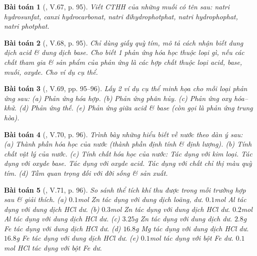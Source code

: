 \documentclass{article}
\newtheorem{baitoan}{Bài toán}
\begin{document}
\begin{baitoan}[\cite{Truong_BTNC_Hoa_Hoc_8_2022}, V.67, p. 95]
	Viết CTHH của những muối có tên sau: natri hydrosunfat, canxi hydrocarbonat, natri đihydrophotphat, natri hydrophophat, natri photphat.
\end{baitoan}

\begin{baitoan}[\cite{Truong_BTNC_Hoa_Hoc_8_2022}, V.68, p. 95]
	Chỉ dùng giấy quỳ tím, mô tả cách nhận biết dung dịch acid \& dung dịch base. Cho biết 1 phản ứng hóa học thuộc loại gì, nếu các chất tham gia \& sản phẩm của phản ứng là các hợp chất thuộc loại acid, base, muối, oxyde. Cho ví dụ cụ thể.
\end{baitoan}

\begin{baitoan}[\cite{Truong_BTNC_Hoa_Hoc_8_2022}, V.69, pp. 95--96]
	Lấy 2 ví dụ cụ thể minh họa cho mỗi loại phản ứng sau: (a) Phản ứng hóa hợp. (b) Phản ứng phân hủy. (c) Phản ứng oxy hóa--khử. (d) Phản ứng thế. (e) Phản ứng giữa acid \& base (còn gọi là \emph{phản ứng trung hòa}).
\end{baitoan}

\begin{baitoan}[\cite{Truong_BTNC_Hoa_Hoc_8_2022}, V.70, p. 96]
	Trình bày những hiểu biết về nước theo dàn ý sau: (a) Thành phần hóa học của nước (thành phần định tính \& định lượng). (b) Tính chất vật lý của nước. (c) Tính chất hóa học của nước: Tác dụng với kim loại. Tác dụng với oxyde base. Tác dụng với oxyde acid. Tác dụng với chất chỉ thị màu quỳ tím. (d) Tầm quan trọng đối với đời sống \& sản xuất.
\end{baitoan}

\begin{baitoan}[\cite{Truong_BTNC_Hoa_Hoc_8_2022}, V.71, p. 96]
	So sánh thể tích khí \emph{} thu được trong mỗi trường hợp sau \& giải thích. (a) $0.1$\emph{mol Zn} tác dụng với dung dịch \emph{} loãng, dư. $0.1$\emph{mol Al} tác dụng với dung dịch \emph{HCl} dư. (b) $0.3$\emph{mol Zn} tác dụng với dung dịch \emph{HCl} dư. $0.2$\emph{mol Al} tác dụng với dung dịch \emph{HCl} dư. (c) $3.25$\emph{g Zn} tác dụng với dung dịch \emph{} dư. $2.8$\emph{g Fe} tác dụng với dung dịch \emph{HCl} dư. (d) $16.8$\emph{g Mg} tác dụng với dung dịch \emph{HCl} dư. $16.8$\emph{g Fe} tác dụng với dung dịch \emph{HCl} dư. (e) $0.1$\emph{mol } tác dụng với bột \emph{Fe} dư. $0.1$\emph{mol HCl} tác dụng với bột \emph{Fe} dư.
\end{baitoan}
\end{document}
